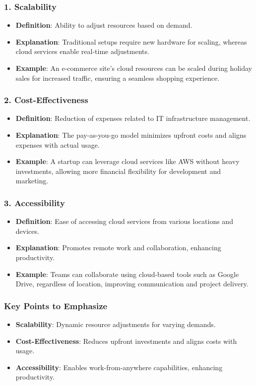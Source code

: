 \documentclass[aspectratio=169]{beamer}
\begin{document}
\begin{frame}[fragile]
  \frametitle{1. Scalability}
  \begin{itemize}
    \item \textbf{Definition}: Ability to adjust resources based on demand.
    \item \textbf{Explanation}: Traditional setups require new hardware for scaling, whereas cloud services enable real-time adjustments.
    \item \textbf{Example}: An e-commerce site's cloud resources can be scaled during holiday sales for increased traffic, ensuring a seamless shopping experience.
  \end{itemize}
\end{frame}

\begin{frame}[fragile]
  \frametitle{2. Cost-Effectiveness}
  \begin{itemize}
    \item \textbf{Definition}: Reduction of expenses related to IT infrastructure management.
    \item \textbf{Explanation}: The pay-as-you-go model minimizes upfront costs and aligns expenses with actual usage.
    \item \textbf{Example}: A startup can leverage cloud services like AWS without heavy investments, allowing more financial flexibility for development and marketing.
  \end{itemize}
\end{frame}

\begin{frame}[fragile]
  \frametitle{3. Accessibility}
  \begin{itemize}
    \item \textbf{Definition}: Ease of accessing cloud services from various locations and devices.
    \item \textbf{Explanation}: Promotes remote work and collaboration, enhancing productivity.
    \item \textbf{Example}: Teams can collaborate using cloud-based tools such as Google Drive, regardless of location, improving communication and project delivery.
  \end{itemize}
\end{frame}

\begin{frame}[fragile]
  \frametitle{Key Points to Emphasize}
  \begin{itemize}
    \item \textbf{Scalability}: Dynamic resource adjustments for varying demands.
    \item \textbf{Cost-Effectiveness}: Reduces upfront investments and aligns costs with usage.
    \item \textbf{Accessibility}: Enables work-from-anywhere capabilities, enhancing productivity.
  \end{itemize}
\end{frame}
\end{document}
